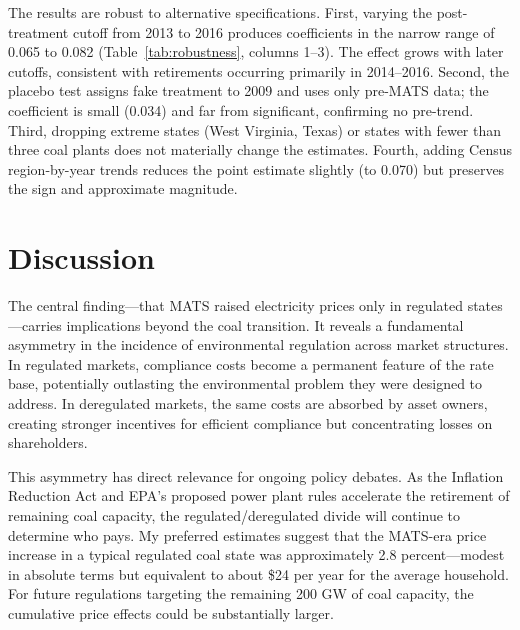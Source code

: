 \documentclass[12pt]{article}
\begin{document}
The results are robust to alternative specifications. First, varying the post-treatment cutoff from 2013 to 2016 produces coefficients in the narrow range of 0.065 to 0.082 (Table~\ref{tab:robustness}, columns 1--3). The effect grows with later cutoffs, consistent with retirements occurring primarily in 2014--2016. Second, the placebo test assigns fake treatment to 2009 and uses only pre-MATS data; the coefficient is small (0.034) and far from significant, confirming no pre-trend. Third, dropping extreme states (West Virginia, Texas) or states with fewer than three coal plants does not materially change the estimates. Fourth, adding Census region-by-year trends reduces the point estimate slightly (to 0.070) but preserves the sign and approximate magnitude.


\section{Discussion}

The central finding---that MATS raised electricity prices only in regulated states---carries implications beyond the coal transition. It reveals a fundamental asymmetry in the incidence of environmental regulation across market structures. In regulated markets, compliance costs become a permanent feature of the rate base, potentially outlasting the environmental problem they were designed to address. In deregulated markets, the same costs are absorbed by asset owners, creating stronger incentives for efficient compliance but concentrating losses on shareholders.

This asymmetry has direct relevance for ongoing policy debates. As the Inflation Reduction Act and EPA's proposed power plant rules accelerate the retirement of remaining coal capacity, the regulated/deregulated divide will continue to determine who pays. My preferred estimates suggest that the MATS-era price increase in a typical regulated coal state was approximately 2.8 percent---modest in absolute terms but equivalent to about \$24 per year for the average household. For future regulations targeting the remaining 200 GW of coal capacity, the cumulative price effects could be substantially larger.
\end{document}
